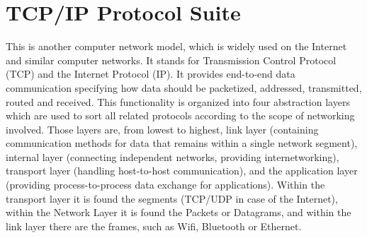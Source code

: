\documentclass[12pt,a4paper]{report}
\begin{document}
\section{TCP/IP Protocol Suite}
This is another computer network model, which is widely used on the Internet and similar computer networks. It stands for Transmission Control Protocol (TCP) and the Internet Protocol (IP). It provides end-to-end data communication specifying how data should be packetized, addressed, transmitted, routed and received. This functionality is organized into four abstraction layers which are used to sort all related protocols according to the scope of networking involved. Those layers are, from lowest to highest, link layer (containing communication methods for data that remains within a single network segment), internal layer (connecting independent networks, providing internetworking), transport layer (handling host-to-host communication), and the application layer (providing process-to-process data exchange for applications). Within the transport layer it is found the segments (TCP/UDP in case of the Internet), within the Network Layer it is found the Packets or Datagrams, and within the link layer there are the frames, such as Wifi, Bluetooth or Ethernet. 
\end{document}
